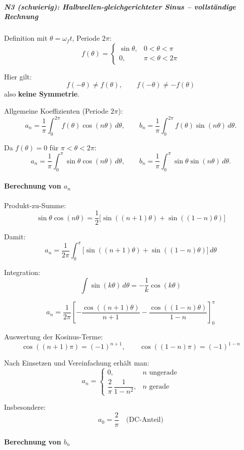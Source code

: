 \subparagraph{N3 (schwierig): Halbwellen-gleichgerichteter Sinus – vollständige Rechnung}

Definition mit $\theta=\omega_f t$, Periode $2\pi$:
\[
f(\theta)=
\begin{cases}
\sin\theta, & 0<\theta<\pi\\
0, & \pi<\theta<2\pi
\end{cases}
\]

Hier gilt:
\[
f(-\theta)\neq f(\theta),
\qquad
f(-\theta)\neq -f(\theta)
\]
also \textbf{keine Symmetrie}.

Allgemeine Koeffizienten (Periode $2\pi$):
\[
a_n=\frac{1}{\pi}\int_0^{2\pi} f(\theta)\cos(n\theta)\,d\theta,
\qquad
b_n=\frac{1}{\pi}\int_0^{2\pi} f(\theta)\sin(n\theta)\,d\theta.
\]

Da $f(\theta)=0$ für $\pi<\theta<2\pi$:
\[
a_n=\frac{1}{\pi}\int_0^{\pi} \sin\theta\cos(n\theta)\,d\theta,
\qquad
b_n=\frac{1}{\pi}\int_0^{\pi} \sin\theta\sin(n\theta)\,d\theta.
\]

\paragraph{Berechnung von $a_n$}

Produkt-zu-Summe:
\[
\sin\theta\cos(n\theta)=\frac{1}{2}
\Big[\sin((n+1)\theta)+\sin((1-n)\theta)\Big]
\]

Damit:
\[
a_n=\frac{1}{2\pi}\int_0^{\pi}
\Big[\sin((n+1)\theta)+\sin((1-n)\theta)\Big]\,d\theta
\]

Integration:
\[
\int \sin(k\theta)\,d\theta=-\frac{1}{k}\cos(k\theta)
\]

\[
a_n=\frac{1}{2\pi}
\left[
-\frac{\cos((n+1)\theta)}{n+1}
-\frac{\cos((1-n)\theta)}{1-n}
\right]_0^{\pi}
\]

Auswertung der Kosinus-Terme:
\[
\cos((n+1)\pi)=(-1)^{n+1},\qquad
\cos((1-n)\pi)=(-1)^{1-n}
\]

Nach Einsetzen und Vereinfachung erhält man:
\[
\boxed{
a_n=
\begin{cases}
0, & n \text{ ungerade} \\[6pt]
\dfrac{2}{\pi}\,\dfrac{1}{1-n^2}, & n \text{ gerade}
\end{cases}
}
\]

Insbesondere:
\[
\boxed{a_0=\frac{2}{\pi}} \quad \text{(DC-Anteil)}
\]

\paragraph{Berechnung von $b_n$}

